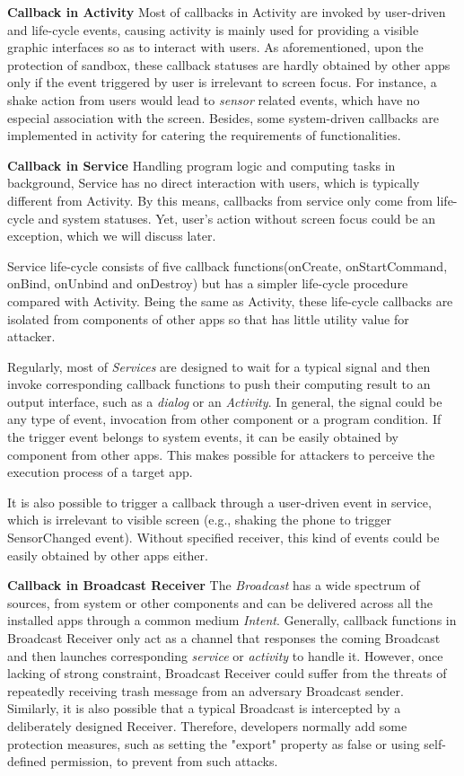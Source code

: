 \documentclass{sig-alternate-05-2015}
\begin{document}
\textbf{Callback in Activity} 
Most of callbacks in Activity are invoked by user-driven and life-cycle events, causing activity is mainly used for providing a visible graphic interfaces so as to interact with users. As aforementioned, upon the protection of sandbox, these callback statuses are hardly obtained by other apps only if the event triggered by user is irrelevant to screen focus. For instance, a shake action from users would lead to \textit{sensor} related events, which have no especial association with the screen. Besides, some system-driven callbacks are implemented in activity for catering the requirements of functionalities. 

\textbf{Callback in Service} 
Handling program logic and computing tasks in background, Service has no direct interaction with users, which is typically different from Activity. By this means, callbacks from service only come from life-cycle and system statuses. Yet, user's action without screen focus could be an exception, which we will discuss later.

Service life-cycle consists of five callback functions(onCreate, onStartCommand, onBind, onUnbind and onDestroy) but has a simpler life-cycle procedure compared with Activity. Being the same as Activity, these life-cycle callbacks are isolated from components of other apps so that has little utility value for attacker. 

Regularly, most of \textit{Services} are designed to wait for a typical signal and then invoke corresponding callback functions to push their computing result to an output interface, such as a \textit{dialog} or an \textit{Activity}. In general, the signal could be any type of event, invocation from other component or a program condition. If the trigger event belongs to system events, it can be easily obtained by component from other apps. This makes possible for attackers to perceive the execution process of a target app.

It is also possible to trigger a callback through a user-driven event in service, which is irrelevant to visible screen (e.g., shaking the phone to trigger SensorChanged event). Without specified receiver, this kind of events could be easily obtained by other apps either.   

\textbf{Callback in Broadcast Receiver} 
The \textit{Broadcast} has a wide spectrum of sources, from system or other components and can be delivered across all the installed apps through a common medium \textit{Intent}. Generally, callback functions in Broadcast Receiver only act as a channel that responses the coming Broadcast and then launches corresponding \textit{service} or \textit{activity} to handle it. However, once lacking of strong constraint, Broadcast Receiver could suffer from the threats of repeatedly receiving trash message from an adversary Broadcast sender. Similarly, it is also possible that a typical Broadcast is intercepted by a deliberately designed Receiver. Therefore, developers normally add some protection measures, such as setting the "export" property as false or using self-defined permission, to prevent from such attacks.
\end{document}
